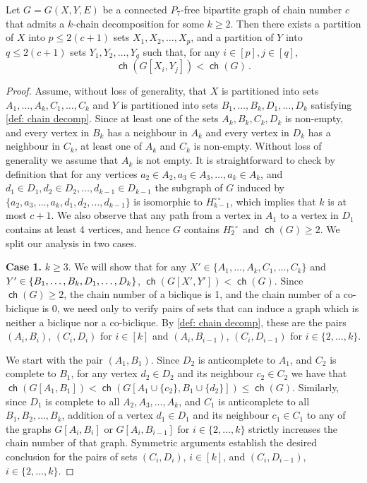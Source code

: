 \documentclass{theoretics}
\newcommand\splitaftercomma[1]{%
  \begingroup
  \begingroup\lccode`~=`, \lowercase{\endgroup
    \edef~{\mathchar\the\mathcode`, \penalty0 \noexpand\hspace{0pt plus .25em}}%
  }\mathcode`,="8000 #1%
  \endgroup
}
\DeclareMathOperator\ch{\mathsf{ch}}
\begin{document}
\begin{lemma}
	\label{lemma: P7 decomp G}
	Let $G=G(X,Y,E)$ be a connected $P_7$-free bipartite graph of chain number $c$ that
	admits a $k$-chain decomposition for some $k \geq 2$. Then there exists 
	a partition of $X$ into $p \leq 2(c+1)$ sets $X_1, X_2, \ldots, X_p$, and
	a partition of $Y$ into $q \leq 2(c+1)$ sets $Y_1, Y_2, \ldots, Y_q$ such that, for any $i
  \in [p], j \in [q]$,
	\[
	\ch(G[X_i, Y_j]) <  \ch(G) \,.
	\]
\end{lemma}
\begin{proof}
	Assume, without loss of generality, that $X$ is partitioned into sets $A_1, \ldots, A_k, C_1, \ldots, C_k$ and $Y$ is partitioned into sets $B_1, \ldots, B_k, D_1, \ldots, D_k$ satisfying \cref{def: chain decomp}.
	Since at least one of the sets $A_k, B_k,C_k,D_k$ is non-empty, and
	every vertex in $B_k$ has a neighbour in $A_k$ and every vertex in $D_k$ has a neighbour in $C_k$,
	at least one of $A_k$ and $C_k$ is non-empty. Without loss of generality we assume that $A_k$ is not empty.
	It is straightforward to check by definition that for any vertices $a_2 \in A_2, a_3 \in A_3, \ldots, a_k \in A_k$,
	and $d_1 \in D_1, d_2 \in D_2, \ldots, d_{k-1} \in D_{k-1}$ the subgraph of $G$ induced by 
	$\{ a_2, a_3, \ldots, a_k, d_1, d_2, \ldots, d_{k-1} \}$ is isomorphic to $H^{\circ\circ}_{k-1}$, which implies that $k$ is at most $c+1$.
	We also observe that any path from a vertex in $A_1$ to a vertex in $D_1$
	contains at least 4 vertices, and hence $G$ contains $H^{\circ\circ}_2$ and 
	$\ch(G) \geq 2$. We split our analysis in two cases.
	
	\textbf{Case 1.} $k \geq 3$. We will show that for any 
	$X' \in \{ A_1, \ldots, A_k, C_1, \ldots, C_k \}$ and $Y' \in \{ B_1, \ldots, B_k\splitaftercomma{,} D_1, \ldots, D_k \}$,
	$\ch(G[X',Y']) < \ch(G)$. Since $\ch(G) \geq 2$, the chain number of a biclique is 1, and the chain number of a co-biclique is 0, we need only to verify pairs of sets that can induce a graph which is neither a biclique nor a co-biclique. By \cref{def: chain decomp}, these are the pairs 
	$(A_i, B_i)$, $(C_i, D_i)$  for $i \in [k]$ and $(A_i, B_{i-1})$, $(C_i, D_{i-1})$ for $i \in \{2, \ldots, k\}$. 
	
	We start with the pair $(A_1, B_1)$. Since $D_2$ is anticomplete to $A_1$, and $C_2$ is complete to $B_1$, for any vertex $d_2 \in D_2$ and its neighbour $c_2 \in C_2$ we have that $\ch(G[A_1,B_1]) < \ch(G[A_1 \cup \{ c_2 \}, B_1 \cup \{d_2\}]) \leq \ch(G)$. Similarly, since $D_1$ is complete to all $A_2, A_3, \ldots, A_k$, and $C_1$ is anticomplete to all $B_1, B_2, \ldots, B_k$, addition of a vertex $d_1 \in D_1$ and its neighbour $c_1 \in C_1$ to
	any of the graphs $G[A_i, B_i]$ or $G[A_i, B_{i-1}]$ for $i \in \{2, \ldots, k\}$ strictly increases the chain number of that graph. Symmetric arguments establish the desired conclusion for the pairs of sets
	$(C_i, D_i)$, $i \in [k]$, and $(C_i, D_{i-1})$, $i \in \{2, \ldots, k\}$.
	

\end{proof}
\end{document}
